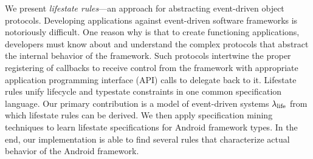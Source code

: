 We present \emph{lifestate rules}---an approach for abstracting event-driven object protocols.
Developing applications against event-driven software frameworks is notoriously difficult.
One reason why is that to create functioning applications, developers must know about and understand the complex protocols that abstract the internal behavior of the framework.
Such protocols intertwine the proper registering of callbacks to receive control from the framework with appropriate application programming interface (API) calls to delegate back to it.
%
Lifestate rules unify lifecycle and typestate constraints in one common specification language. Our primary contribution is a model of event-driven systems $\lambda_{\text{life}}$ from which lifestate rules can be derived.
We then apply specification mining techniques to learn lifestate specifications for Android framework types.
In the end, our implementation is able to find several rules that characterize actual behavior of the Android framework.
